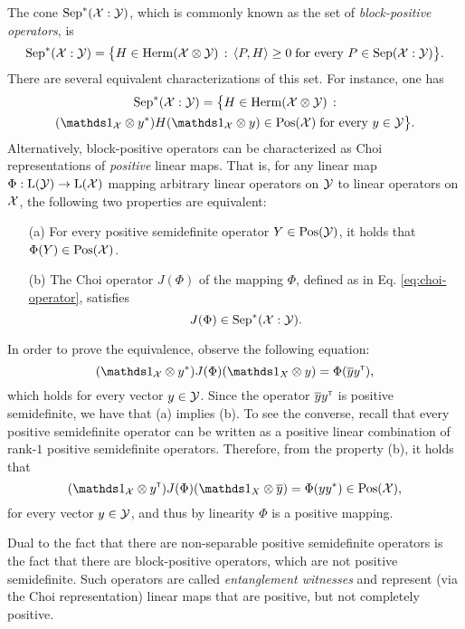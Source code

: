The cone $\mathrm{Sep}^{\ast}(\mathcal{X} : \mathcal{Y})$, which is commonly known as the set of 
\emph{block-positive operators}, is
\begin{equation}
  \mathrm{Sep}^{\ast}(\mathcal{X}:\mathcal{Y}) = \bigl\{
  H\in\mathrm{Herm}(\mathcal{X}\otimes\mathcal{Y})\,:\,
  \langle P , H\rangle \geq 0 \;\text{for every $P \in \mathrm{Sep}(\mathcal{X}:\mathcal{Y})$}\bigr\}.
\end{equation}
There are several equivalent characterizations of this set.
For instance, one has
\begin{multline}
  \BPos(\X:\Y) = \bigl\{
  H\in\Herm(\X\otimes\Y)\,:\\
  (\I_{\X} \otimes y^{\ast}) H (\I_{\X} \otimes y)\in\Pos(\X)
  \;\text{for every $y\in\Y$}\bigr\}.
\end{multline}
Alternatively, block-positive operators can be characterized as Choi 
representations of \emph{positive} linear maps.
That is, for any linear map $\Phi:\mathrm{L}(\mathcal{Y})\rightarrow\mathrm{L}(\mathcal{X})$
mapping arbitrary linear operators on $\mathcal{Y}$ to linear operators on $\mathcal{X}$, the
following two properties are equivalent:
\begin{itemize}
\item[(a)] For every positive semidefinite operator $Y \in \mathrm{Pos}(\mathcal{Y})$, it 
holds that $\Phi(Y) \in \mathrm{Pos}(\mathcal{X})$. 
\item[(b)] The Choi operator $J(\Phi)$ of the mapping $\Phi$,
defined as in Eq. \eqref{eq:choi-operator}, satisfies 
\begin{equation}
  J(\Phi) \in \mathrm{Sep}^{\ast}(\mathcal{X}:\mathcal{Y}).
\end{equation}
\end{itemize}
In order to prove the equivalence, observe the following equation:
\begin{equation}
\label{eq:choi-positive}
  (\I_{\X}\otimes y^{\ast})J(\Phi)(\I_{X}\otimes y) = \Phi(\overline{y}y^{\t}),
\end{equation}
which holds for every vector $y\in\mathcal{Y}$.
Since the operator $\overline{y}y^{{\scriptscriptstyle\mathsf{T}}}$ is positive semidefinite,
we have that (a) implies (b).
To see the converse, recall that every positive semidefinite operator can be 
written as a positive linear combination of rank-$1$ positive semidefinite 
operators. Therefore, from the property (b), it holds that 
\begin{equation}
 (\I_{\X}\otimes y^{\t})J(\Phi)(\I_{X}\otimes \overline{y}) = \Phi(yy^{\ast}) 
  \in\Pos(\X),
\end{equation}
for every vector $y\in\mathcal{Y}$, and thus by linearity $\Phi$ is a positive mapping. 

Dual to the fact that there are non-separable positive semidefinite operators 
is the fact that there are block-positive operators, which are not 
positive semidefinite. Such operators are called \emph{entanglement witnesses} 
and represent (via the Choi representation) linear maps that are positive, 
but not completely positive.

